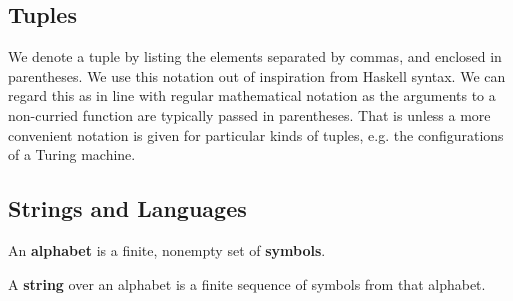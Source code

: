 





\subsection{Tuples}

\begin{notation} We denote a tuple by listing the elements separated by commas,
and enclosed in parentheses. We use this notation out of inspiration from
Haskell syntax. We can regard this as in line with regular mathematical
notation as the arguments to a non-curried function are typically passed in
parentheses. That is unless a more convenient notation is given for particular
kinds of tuples, e.g. the configurations of a Turing machine.\end{notation}

\subsection{Strings and Languages}

\begin{definition} An \textbf{alphabet} is a finite, nonempty set of
\textbf{symbols}.  \end{definition}

\begin{definition} A \textbf{string} over an alphabet is a finite sequence of
symbols from that alphabet. \end{definition}

